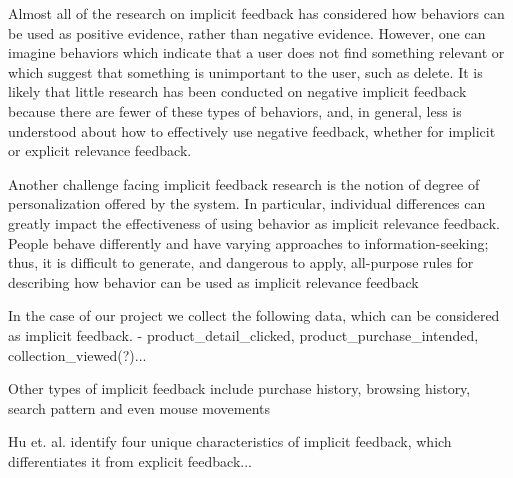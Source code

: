 Almost all of the research on implicit feedback has considered how behaviors can
be used as positive evidence, rather than negative evidence. However, one can imagine
behaviors which indicate that a user does not find something relevant or which suggest
that something is unimportant to the user, such as delete. It is likely that little research
has been conducted on negative implicit feedback because there are fewer of these types
of behaviors, and, in general, less is understood about how to effectively use negative
feedback, whether for implicit or explicit relevance feedback.

Another challenge facing implicit feedback research is the notion of degree of
personalization offered by the system. In particular, individual differences can greatly
impact the effectiveness of using behavior as implicit relevance feedback. People behave
differently and have varying approaches to information-seeking; thus, it is difficult to
generate, and dangerous to apply, all-purpose rules for describing how behavior can be
used as implicit relevance feedback


In the case of our project we collect the following data, which can be
considered as implicit feedback.  - product\_detail\_clicked,
product\_purchase\_intended, collection\_viewed(?)...

Other types of implicit feedback include purchase history, browsing
history, search pattern and even mouse movements

Hu et. al. \cite{Hu2008} identify four unique characteristics of implicit
feedback, which differentiates it from explicit feedback...


